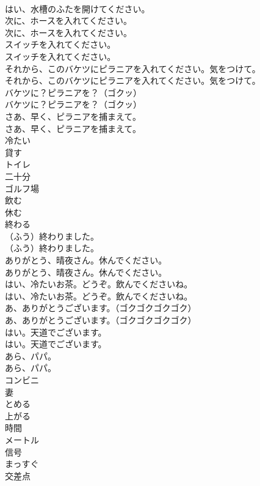 \documentclass[8pt]{extreport}
\begin{document}
\begin{CJK}{UTF8}{min}
\\	はい、水槽のふたを開けてください。 
\\	次に、ホースを入れてください。	
\\	次に、ホースを入れてください。 
\\	スイッチを入れてください。	
\\	スイッチを入れてください。 
\\	それから、このバケツにピラニアを入れてください。気をつけて。	
\\	それから、このバケツにピラニアを入れてください。気をつけて。 
\\	バケツに？ピラニアを？（ゴクッ）	
\\	バケツに？ピラニアを？（ゴクッ） 
\\	さあ、早く、ピラニアを捕まえて。	
\\	さあ、早く、ピラニアを捕まえて。 
\\	冷たい
\\	貸す
\\	トイレ
\\	二十分
\\	ゴルフ場
\\	飲む
\\	休む
\\	終わる
\\	（ふう）終わりました。	
\\	（ふう）終わりました。 
\\	ありがとう、晴夜さん。休んでください。	
\\	ありがとう、晴夜さん。休んでください。 
\\	はい、冷たいお茶。どうぞ。飲んでくださいね。	
\\	はい、冷たいお茶。どうぞ。飲んでくださいね。 
\\	あ、ありがとうございます。（ゴクゴクゴクゴク）	
\\	あ、ありがとうございます。（ゴクゴクゴクゴク） 
\\	はい。天道でございます。	
\\	はい。天道でございます。 
\\	あら、パパ。	
\\	あら、パパ。 
\\	コンビニ
\\	妻
\\	とめる
\\	上がる
\\	時間
\\	メートル
\\	信号
\\	まっすぐ
\\	交差点

\end{CJK}
\end{document}
